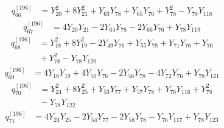 \begin{equation}\label{q196:row:066}
\begin{aligned}
q_{66}^{[196]} &={} Y_{20}^{2} + 8Y_{21}^{2} + Y_{63}Y_{78} + Y_{65}Y_{76} + Y_{78}^{2} - Y_{78}Y_{118}
\end{aligned}
\end{equation}
\begin{equation}\label{q196:row:067}
\begin{aligned}
q_{67}^{[196]} &={} 4Y_{20}Y_{21} - 2Y_{64}Y_{78} - 2Y_{66}Y_{76} + Y_{78}Y_{119}
\end{aligned}
\end{equation}
\begin{equation}\label{q196:row:068}
\begin{aligned}
q_{68}^{[196]} &={} Y_{18}^{2} + 8Y_{19}^{2} - 2Y_{49}Y_{76} + Y_{55}Y_{78} + Y_{71}Y_{76} + Y_{76}\\
&{} + Y_{78}^{2} - Y_{78}Y_{120}
\end{aligned}
\end{equation}
\begin{equation}\label{q196:row:069}
\begin{aligned}
q_{69}^{[196]} &={} 4Y_{18}Y_{19} + 4Y_{50}Y_{76} - 2Y_{56}Y_{78} - 4Y_{72}Y_{76} + Y_{78}Y_{121}
\end{aligned}
\end{equation}
\begin{equation}\label{q196:row:070}
\begin{aligned}
q_{70}^{[196]} &={} Y_{24}^{2} + 8Y_{25}^{2} + Y_{53}Y_{77} + Y_{57}Y_{78} + Y_{76}Y_{116} + Y_{78}^{2}\\
&{} - Y_{78}Y_{122}
\end{aligned}
\end{equation}
\begin{equation}\label{q196:row:071}
\begin{aligned}
q_{71}^{[196]} &={} 4Y_{24}Y_{25} - 2Y_{54}Y_{77} - 2Y_{58}Y_{78} - Y_{76}Y_{117} + Y_{78}Y_{123}
\end{aligned}
\end{equation}
